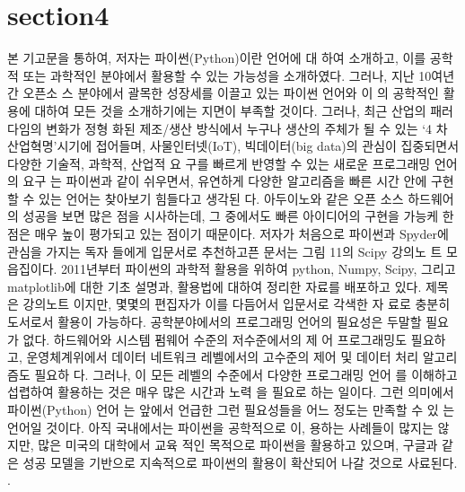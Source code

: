 \documentclass{article}
\begin{document}
\section{section4}
본 기고문을 통하여, 저자는 파이썬(Python)이란 언어에 대
하여 소개하고, 이를 공학적 또는 과학적인 분야에서 활용할
수 있는 가능성을 소개하였다. 그러나, 지난 10여년간 오픈소
스 분야에서 괄목한 성장세를 이끌고 있는 파이썬 언어와 이
의 공학적인 활용에 대하여 모든 것을 소개하기에는 지면이
부족할 것이다. 그러나, 최근 산업의 패러다임의 변화가 정형
화된 제조/생산 방식에서 누구나 생산의 주체가 될 수 있는 ‘4
차 산업혁명’시기에 접어들며, 사물인터넷(IoT), 빅데이터(big
data)의 관심이 집중되면서 다양한 기술적, 과학적, 산업적 요
구를 빠르게 반영할 수 있는 새로운 프로그래밍 언어의 요구
는 파이썬과 같이 쉬우면서, 유연하게 다양한 알고리즘을 빠른
시간 안에 구현할 수 있는 언어는 찾아보기 힘들다고 생각된
다. 아두이노와 같은 오픈 소스 하드웨어의 성공을 보면 많은
점을 시사하는데, 그 중에서도 빠른 아이디어의 구현을 가능케
한 점은 매우 높이 평가되고 있는 점이기 때문이다.
저자가 처음으로 파이썬과 Spyder에 관심을 가지는 독자
들에게 입문서로 추천하고픈 문서는 그림 11의 Scipy 강의노
트 모읍집이다.
2011년부터 파이썬의 과학적 활용을 위하여 python,
Numpy, Scipy, 그리고 matplotlib에 대한 기초 설명과, 활용법에 대하여 정리한 자료를 배포하고 있다. 제목은 강의노트
이지만, 몇몇의 편집자가 이를 다듬어서 입문서로 각색한 자
료로 충분히 도서로서 활용이 가능하다.
공학분야에서의 프로그래밍 언어의 필요성은 두말할 필요
가 없다. 하드웨어와 시스템 펌웨어 수준의 저수준에서의 제
어 프로그래밍도 필요하고, 운영체계위에서 데이터 네트워크
레벨에서의 고수준의 제어 및 데이터 처리 알고리즘도 필요하
다. 그러나, 이 모든 레벨의 수준에서 다양한 프로그래밍 언어
를 이해하고 섭렵하여 활용하는 것은 매우 많은 시간과 노력
을 필요로 하는 일이다. 그런 의미에서 파이썬(Python) 언어
는 앞에서 언급한 그런 필요성들을 어느 정도는 만족할 수 있
는 언어일 것이다. 아직 국내에서는 파이썬을 공학적으로 이,
용하는 사례들이 많지는 않지만, 많은 미국의 대학에서 교육
적인 목적으로 파이썬을 활용하고 있으며, 구글과 같은 성공
모델을 기반으로 지속적으로 파이썬의 활용이 확산되어 나갈
것으로 사료된다. \cite{lee2016공학적}.


\end{document}
